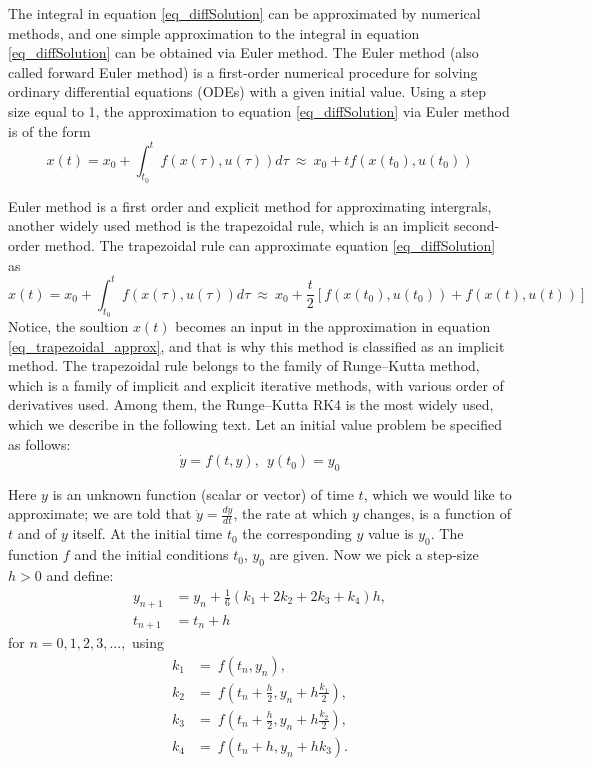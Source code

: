 \documentclass  [
  paper    = a4,
  BCOR     = 10mm,
  twoside,
  fontsize = 12pt,
  fleqn,
  toc      = bibnumbered,
  toc      = listofnumbered,
  numbers  = noendperiod,
  headings = normal,
  listof   = leveldown,
  version  = 3.03
]                                       {scrreprt}
\newcommand{\<}{\langle}
\renewcommand{\>}{\rangle}
\begin{document}
The integral in equation \ref{eq_diffSolution} can be approximated by numerical methods, and one simple approximation to the integral in equation \ref{eq_diffSolution} can be obtained via Euler method. The Euler method (also called forward Euler method) is a first-order numerical procedure for solving ordinary differential equations (ODEs) with a given initial value. Using a step size equal to 1, the approximation to equation \ref{eq_diffSolution} via Euler method is of the form
\begin{equation}
	x(t)  = x_0  + \int_{t_0}^{t}  f(x(\tau), u(\tau)) d \tau \ \approx \   x_0  + t f(x(t_0), u(t_0))
	\label{eq_Euler_approx}
\end{equation}

Euler method is a first order and explicit method for approximating intergrals, another widely used method is the trapezoidal rule, which is an implicit second-order method. The trapezoidal rule can approximate equation \ref{eq_diffSolution} as 
\begin{equation}
	x(t)  = x_0  + \int_{t_0}^{t}  f(x(\tau), u(\tau)) d \tau \ \approx \   x_0  + \frac{t}{2}[f(x(t_0), u(t_0)) + f(x(t), u(t))]  
	\label{eq_trapezoidal_approx}
\end{equation}
Notice, the soultion $x(t)$ becomes an input in the approximation in equation \ref{eq_trapezoidal_approx}, and that is why this method is classified as an implicit method. The trapezoidal rule belongs to the family of Runge–Kutta method, which is a family of implicit and explicit iterative methods, with various order of derivatives used. Among them, the Runge–Kutta  RK4 is the most widely used, which we describe in the following text. Let an initial value problem be specified as follows:
\begin{equation}\label{eqn:RK4_diff}
 \dot{y} = f(t, y) , \ \  y(t_0) = y_0  
\end{equation}

Here $y$ is an unknown function (scalar or vector) of time $t$, which we would like to approximate; we are told that $\dot{y} = \frac{dy}{dt}$, the rate at which $y$ changes, is a function of $t$ and of $y$ itself. At the initial time $t_0$ the corresponding $y$ value is $y_0$. The function $f$ and the initial conditions $t_0$, $y_0$ are given. Now we pick a step-size $h>0$ and define:
\begin{align}
	y_{n+1} &= y_n + \frac{1}{6}\left(k_1 + 2k_2 + 2k_3 + k_4 \right)h,\\
	t_{n+1} &= t_n + h
\end{align}
for $n = 0, 1, 2, 3, ...,$ using
\begin{align}
	k_1 &= \ f(t_n, y_n), \\
	k_2 &= \ f\!\left(t_n + \frac{h}{2}, y_n + h\frac{k_1}{2}\right), \\ 
	k_3 &= \ f\!\left(t_n + \frac{h}{2}, y_n + h\frac{k_2}{2}\right), \\
	k_4 &= \ f\!\left(t_n + h, y_n + hk_3\right).
\end{align}
\end{document}
